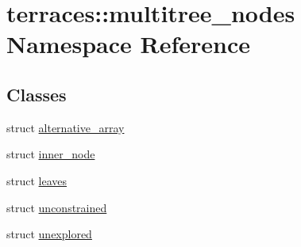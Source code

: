 \hypertarget{namespaceterraces_1_1multitree__nodes}{}\section{terraces\+:\+:multitree\+\_\+nodes Namespace Reference}
\label{namespaceterraces_1_1multitree__nodes}
\subsection*{Classes}
\begin{DoxyCompactItemize}
\item 
struct \hyperlink{structterraces_1_1multitree__nodes_1_1alternative__array}{alternative\+\_\+array}
\item 
struct \hyperlink{structterraces_1_1multitree__nodes_1_1inner__node}{inner\+\_\+node}
\item 
struct \hyperlink{structterraces_1_1multitree__nodes_1_1leaves}{leaves}
\item 
struct \hyperlink{structterraces_1_1multitree__nodes_1_1unconstrained}{unconstrained}
\item 
struct \hyperlink{structterraces_1_1multitree__nodes_1_1unexplored}{unexplored}
\end{DoxyCompactItemize}
